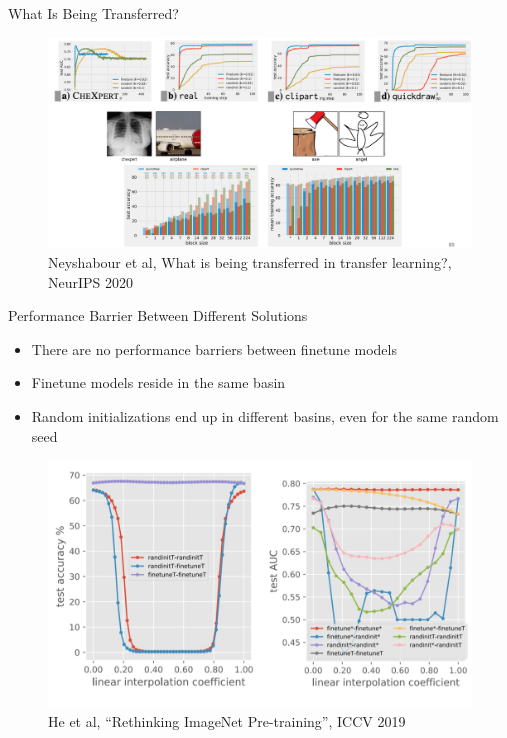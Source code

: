 \documentclass[serif, aspectratio=169]{beamer}
\begin{document}
\begin{frame}{What Is Being Transferred?}
	\begin{figure}[htpb]
		\begin{center}
			\includegraphics[keepaspectratio, scale=0.15]{pic/what_TL}
			\caption*{\scriptsize Neyshabour et al, What is being transferred in transfer learning?, NeurIPS 2020}
		\end{center}
	\end{figure}
\end{frame}

\begin{frame}{Performance Barrier Between Different Solutions}
	\begin{itemize}
		\item There are no performance barriers between finetune models
		\item Finetune models reside in the same basin
		\item Random initializations end up in different basins, even for the same random seed
	\end{itemize}
	
	\begin{figure}
		\includegraphics[keepaspectratio, scale=0.22]{pic/what_TL2}
		\vspace{-1.4em}
		\caption*{\scriptsize He et al, “Rethinking ImageNet Pre-training”, ICCV 2019}
	\end{figure}
\end{frame}
\end{document}
